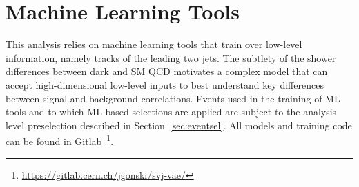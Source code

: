 \chapter{Machine Learning Tools}
\label{ch:ml_tools}

This analysis relies on machine learning tools that train over low-level information, namely tracks of the leading two jets.
The subtlety of the shower differences between dark and SM QCD motivates a complex model that can accept high-dimensional low-level inputs to best understand key differences between signal and background correlations.
Events used in the training of ML tools and to which ML-based selections are applied are subject to the analysis level preselection described in Section~\ref{sec:eventsel}.
All models and training code can be found in Gitlab~\footnote{\url{https://gitlab.cern.ch/jgonski/svj-vae/}}.


